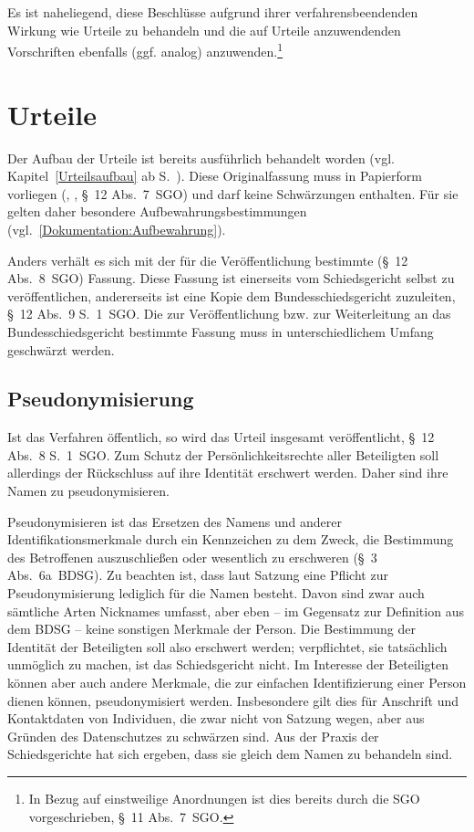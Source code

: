 Es ist naheliegend, diese Beschlüsse aufgrund ihrer verfahrensbeendenden Wirkung wie Urteile zu behandeln und die auf Urteile anzuwendenden Vorschriften ebenfalls (ggf. analog) anzuwenden.\footnote{In Bezug auf einstweilige Anordnungen ist dies bereits durch die SGO vorgeschrieben, \S~11 Abs.~7~SGO.}

\section{Urteile}
\label{Dokumentation:Urteile}
Der Aufbau der Urteile ist bereits ausführlich behandelt worden (vgl. Kapitel~\ref{Urteilsaufbau} ab S.~\pageref{Urteilsaufbau}).
Diese Originalfassung muss in Papierform vorliegen (, , \S~12 Abs.~7~SGO) und darf keine Schwärzungen enthalten.
Für sie gelten daher besondere Aufbewahrungsbestimmungen (vgl.~\ref{Dokumentation:Aufbewahrung}).

Anders verhält es sich mit der für die Veröffentlichung bestimmte (\S~12 Abs.~8~SGO) Fassung.
Diese Fassung ist einerseits vom Schiedsgericht selbst zu veröffentlichen, andererseits ist eine Kopie dem Bundesschiedsgericht zuzuleiten, \S~12 Abs.~9 S.~1~SGO.
Die zur Veröffentlichung bzw. zur Weiterleitung an das Bundesschiedsgericht bestimmte Fassung muss in unterschiedlichem Umfang geschwärzt werden.

\subsection{Pseudonymisierung}
\label{Dokumentation:Urteile:Pseudonymisierung}
Ist das Verfahren öffentlich, so wird das Urteil insgesamt veröffentlicht, \S~12 Abs.~8 S.~1~SGO.
Zum Schutz der Persönlichkeitsrechte aller Beteiligten soll allerdings der Rückschluss auf ihre Identität erschwert werden.
Daher sind ihre Namen zu pseudonymisieren.

Pseudonymisieren ist das Ersetzen des Namens und anderer Identifikationsmerkmale durch ein Kennzeichen zu dem Zweck, die Bestimmung des Betroffenen auszuschließen oder wesentlich zu erschweren (\S~3 Abs.~6a~BDSG).
Zu beachten ist, dass laut Satzung eine Pflicht zur Pseudonymisierung lediglich für die Namen besteht.
Davon sind zwar auch sämtliche Arten Nicknames umfasst, aber eben -- im Gegensatz zur Definition aus dem BDSG -- keine sonstigen Merkmale der Person.
Die Bestimmung der Identität der Beteiligten soll also erschwert werden; verpflichtet, sie tatsächlich unmöglich zu machen, ist das Schiedsgericht nicht.
Im Interesse der Beteiligten können aber auch andere Merkmale, die zur einfachen Identifizierung einer Person dienen können, pseudonymisiert werden.
Insbesondere gilt dies für Anschrift und Kontaktdaten von Individuen, die zwar nicht von Satzung wegen, aber aus Gründen des Datenschutzes zu schwärzen sind.
Aus der Praxis der Schiedsgerichte hat sich ergeben, dass sie gleich dem Namen zu behandeln sind. 

